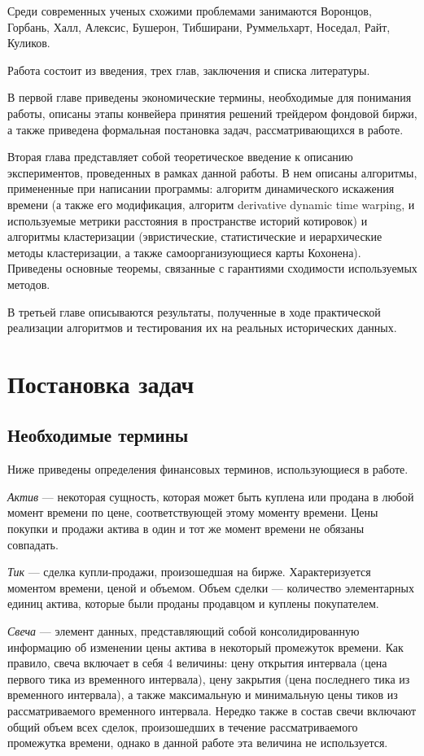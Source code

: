\documentclass[a4paper, 14pt]{extarticle}
\numberwithin{figure}{subsection}
\numberwithin{equation}{subsection}
\begin{document}
Среди современных ученых схожими проблемами занимаются Воронцов, Горбань, Халл, Алексис, Бушерон, Тибширани, Руммельхарт, Носедал, Райт, Куликов.

Работа состоит из введения, трех глав, заключения и списка литературы.

В первой главе приведены экономические термины, необходимые для понимания работы, описаны этапы конвейера принятия решений трейдером фондовой биржи, а также приведена формальная постановка задач, рассматривающихся в работе.

Вторая глава представляет собой теоретическое введение к описанию экспериментов, проведенных в рамках данной работы. В нем описаны алгоритмы, примененные при написании программы: алгоритм динамического искажения времени (а также его модификация, алгоритм derivative dynamic time warping, и используемые метрики расстояния в пространстве историй котировок) и алгоритмы кластеризации (эвристические, статистические и иерархические методы кластеризации, а также самоорганизующиеся карты Кохонена). Приведены основные теоремы, связанные с гарантиями сходимости используемых методов.

В третьей главе описываются результаты, полученные в ходе практической реализации алгоритмов и тестирования их на реальных исторических данных.
\section{Постановка задач}
\subsection{Необходимые термины}
Ниже приведены определения финансовых терминов, использующиеся в работе.

{\it Актив} --- некоторая сущность, которая может быть куплена или продана в любой момент времени по цене, соответствующей этому моменту времени. Цены покупки и продажи актива в один и тот же момент времени не обязаны совпадать.

{\it Тик} --- сделка купли-продажи, произошедшая на бирже. Характеризуется моментом времени, ценой и объемом. Объем сделки --- количество элементарных единиц актива, которые были проданы продавцом и куплены покупателем.

{\it Свеча} --- элемент данных, представляющий собой консолидированную информацию об изменении цены актива в некоторый промежуток времени. Как правило, свеча включает в себя 4 величины: цену открытия интервала (цена первого тика из временного интервала), цену закрытия (цена последнего тика из временного интервала), а также максимальную и минимальную цены тиков из рассматриваемого временного интервала. Нередко также в состав свечи включают общий объем всех сделок, произошедших в течение рассматриваемого промежутка времени, однако в данной работе эта величина не используется.
\end{document}
